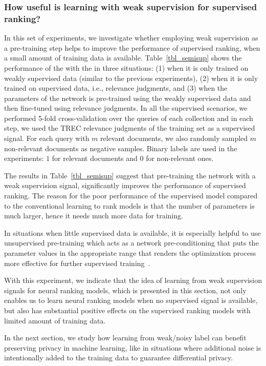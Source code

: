 
\subsubsection{How useful is learning with weak supervision for supervised ranking?}
%
In this set of experiments, we investigate whether employing weak supervision as a pre-training step helps to improve the performance of supervised ranking, when a small amount of training data is available. Table~\ref{tbl_semisup} shows the performance of the \modelthree with the \feedthree in three situations: (1) when it is only trained on weakly supervised data (similar to the previous experiments), (2) when it is only trained on supervised data, i.e., relevance judgments, and (3) when the parameters of the network is pre-trained using the weakly supervised data and then fine-tuned using relevance judgments.
%
In all the supervised scenarios, we performed 5-fold cross-validation over the queries of each collection and in each step, we used the TREC relevance judgments of the training set as a supervised signal. For each query with $m$ relevant documents, we also randomly sampled $m$ non-relevant documents as negative samples. Binary labels are used in the experiments: $1$ for relevant documents and $0$ for non-relevant ones.

The results in Table~\ref{tbl_semisup} suggest that pre-training the network with a weak supervision signal, significantly improves the performance of supervised ranking.
%
The reason for the poor performance of the supervised model compared to the conventional learning to rank models is that the number of parameters is much larger, hence it needs much more data for training.

In situations when little supervised data is available, it is especially helpful to use unsupervised pre-training which acts as a network pre-conditioning that puts the parameter values in the appropriate range that renders the optimization process more effective for further supervised training~\citep{Rrhan:2010}.

With this experiment, we indicate that the idea of learning from weak supervision signals for neural ranking models, which is presented in this section, not only enables us to learn neural ranking models when no supervised signal is available, but also has substantial positive effects on the supervised ranking models with limited amount of training data. 

In the next section, we study how learning from weak/noisy label can benefit preserving privacy in machine learning, like in situations where additional noise is intentionally added to the training data to guarantee differential privacy.  